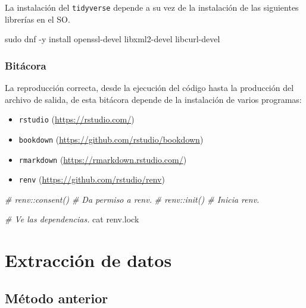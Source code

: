 \documentclass[
]{book}
\newenvironment{Shaded}{\begin{snugshade}}{\end{snugshade}}
\newcommand{\CommentTok}[1]{\textcolor[rgb]{0.56,0.35,0.01}{\textit{#1}}}
\newcommand{\FunctionTok}[1]{\textcolor[rgb]{0.00,0.00,0.00}{#1}}
\newcommand{\NormalTok}[1]{#1}
\providecommand{\tightlist}{%
  \setlength{\itemsep}{0pt}\setlength{\parskip}{0pt}}
\begin{document}
La instalación del \texttt{tidyverse} depende a su vez de la instalación de las siguientes librerías en el SO.

\begin{Shaded}
\begin{Highlighting}[]
\FunctionTok{sudo}\NormalTok{ dnf {-}y install openssl{-}devel libxml2{-}devel libcurl{-}devel}
\end{Highlighting}
\end{Shaded}

\hypertarget{bituxe1cora}{%
\subsection{Bitácora}\label{bituxe1cora}}

La reproducción correcta, desde la ejecución del código hasta la producción del archivo de salida, de esta bitácora depende de la instalación de varios programas:

\begin{itemize}
\tightlist
\item
  \texttt{rstudio} (\url{https://rstudio.com/})
\item
  \texttt{bookdown} (\url{https://github.com/rstudio/bookdown})
\item
  \texttt{rmarkdown} (\url{https://rmarkdown.rstudio.com/})
\item
  \texttt{renv} (\url{https://github.com/rstudio/renv})
\end{itemize}

\begin{Shaded}
\begin{Highlighting}[]
\CommentTok{\# renv::consent() \# Da permiso a renv.}
\CommentTok{\# renv::init() \# Inicia renv.}
\end{Highlighting}
\end{Shaded}

\begin{Shaded}
\begin{Highlighting}[]
\CommentTok{\# Ve las dependencias.}
\FunctionTok{cat}\NormalTok{ renv.lock}
\end{Highlighting}
\end{Shaded}

\hypertarget{extracciuxf3n-de-datos}{%
\chapter{Extracción de datos}\label{extracciuxf3n-de-datos}}

\hypertarget{muxe9todo-anterior}{%
\section{Método anterior}\label{muxe9todo-anterior}}
\end{document}
